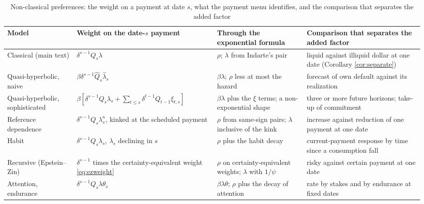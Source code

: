 \documentclass[12pt,english]{article}
\begin{document}
\begin{table}[H]
\centering
\caption{Non-classical preferences: the weight on a payment at date $s$, what the payment menu identifies, and the comparison that separates the added factor}
\label{tab:nonclassical}
\small
\begin{tabular}{p{3.4cm} p{4.1cm} p{3.9cm} p{4.0cm}}
\toprule
Model & Weight on the date-$s$ payment & Through the exponential formula & Comparison that separates the added factor \\
\midrule
Classical (main text) & $\delta^{s-1}Q_s\lambda$ & $\rho$; $\lambda$ from Indarte's pair & liquid against illiquid dollar at one date (Corollary \ref{cor:separate}) \\
Quasi-hyperbolic, naive & $\beta\delta^{s-1}\hat Q_s\hat\lambda_s$ & $\beta\lambda$; $\rho$ less at most the hazard & forecast of own default against its realization \\
Quasi-hyperbolic, sophisticated & $\beta[\delta^{s-1}Q_s\lambda_s + \sum_{t\le s}\delta^{t-1}Q_{t-1}\xi_{t,s}]$ & $\beta\lambda$ plus the $\xi$ terms; a non-exponential shape & three or more future horizons; take-up of commitment \\
Reference dependence & $\delta^{s-1}Q_s\lambda_s^{\kappa}$, kinked at the scheduled payment & $\rho$ from same-sign pairs; $\lambda$ inclusive of the kink & increase against reduction of one payment at one date \\
Habit & $\delta^{s-1}Q_s\lambda_s$, $\lambda_s$ declining in $s$ & $\rho$ plus the habit decay & current-payment response by time since a consumption fall \\
Recursive (Epstein--Zin) & $\delta^{s-1}$ times the certainty-equivalent weight \eqref{eq:ezweight} & $\rho$ on certainty-equivalent weights; $\lambda$ with $1/\psi$ & risky against certain payment at one date \\
Attention, endurance & $\delta^{s-1}Q_s\lambda\theta_s$ & $\beta\lambda\theta$; $\rho$ plus the decay of attention & rate by stakes and by endurance at fixed dates \\
\bottomrule
\end{tabular}
\end{table}
\end{document}
